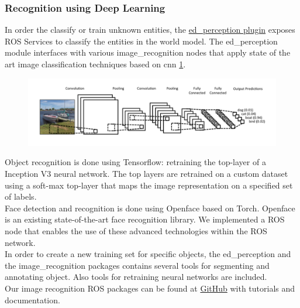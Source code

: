 \subsubsection{Recognition using Deep Learning}
In order the classify or train unknown entities, the \href{https://github.com/tue-robotics/ed_perception}{ed\_perception plugin} exposes ROS Services to classify the entities in the world model. The ed\_perception module interfaces with various image\_recognition nodes that apply state of the art image classification techniques based on \acrfull{cnn} \ref{fig:cnn}.
\begin{figure}[h]
    \centering
	\includegraphics[width = 0.9\linewidth]{Figures/cnn}
    \caption{}
	\label{fig:cnn}
\end{figure}
Object recognition is done using Tensorflow: retraining the top-layer of a Inception V3 neural network. The top layers are retrained on a custom dataset using a soft-max top-layer that maps the image representation on a specified set of labels.
\\
Face detection and recognition is done using Openface based on Torch. Openface is an existing state-of-the-art face recognition library. We implemented a ROS node that enables the use of these advanced technologies within the ROS network.
\\
In order to create a new training set for specific objects, the ed\_perception and the image\_recognition packages contains several tools for segmenting and annotating object. Also tools for retraining neural networks are included.
\\
Our image recognition ROS packages can be found at \href{https://github.com/tue-robotics/image_recognition}{GitHub} with tutorials and documentation. 